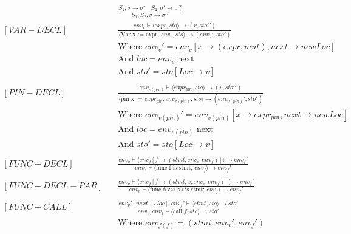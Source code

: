 \begin{align*}
    [COMPOSITION] \quad  &
    \frac
    {S_1, \sigma \rightarrow \sigma \prime \quad S_2, \sigma \prime \rightarrow \sigma \prime \prime}
    {S_1;S_2, \sigma \rightarrow \sigma \prime \prime}
    \\
    [VAR-DECL]     \quad &
    \frac
    {env_v \vdash\langle expr, sto\rangle\to (v, sto\prime \prime)}
    {\langle\text{Var x := expr; }env_v,sto\rangle \to (env_v\prime, sto\prime)} \\
                         & \text{Where } env_v\prime = env_v[x \to (expr, mut), next \to new Loc]                                               \\
                         & \text{And } loc = env_v \text{ next}                               \\
                         & \text{And } sto\prime = sto[Loc \to v]
    \\
    \\
    [PIN-DECL] \quad     &
    \frac
    {env_{v(pin)} \vdash\langle expr_{pin}, sto\rangle\to (v, sto\prime \prime)}
    {\langle\text{pin x := }expr_{pin}; env_{v(pin)}, sto \rangle \to (env_{v(pin)}\prime, sto\prime)} \\
                         & \text{Where } env_{v(pin)}\prime = env_{v(pin)}[x \to expr_{pin}, next \to new Loc]   \\
                         & \text{And }loc = env_{v(pin)} \text{ next}   \\
                         & \text{And }sto\prime = sto[Loc \to v]
    \\
    \\
    [FUNC-DECL] \quad &
    \frac
    {env_v\vdash\langle env_f[f \to (stmt, env_v, env_f)]\rangle \to env_f \prime}
    {env_v \vdash \langle \text{func f is stmt; } env_f \rangle \to env_f\prime} 
    \\
    \\
    [FUNC-DECL-PAR] \quad &
    \frac
    {env_v\vdash\langle env_f[f \to (stmt, x, env_v, env_f)]\rangle \to env_f \prime}
    {env_v \vdash \langle \text{func f(var x) is stmt; } env_f \rangle \to env_f \prime}
    \\
    \\
    [FUNC-CALL] \quad &
    \frac
    {env_v\prime [next \to loc], env_f\prime \vdash \langle stmt, sto \rangle \to sto\prime}
    {env_v, env_f \vdash \langle \text{call }f, sto\rangle \to sto\prime}
    \\ & \text{Where }env_{f(f)} = (stmt, env_v\prime, env_f\prime) \\

\end{align*}
